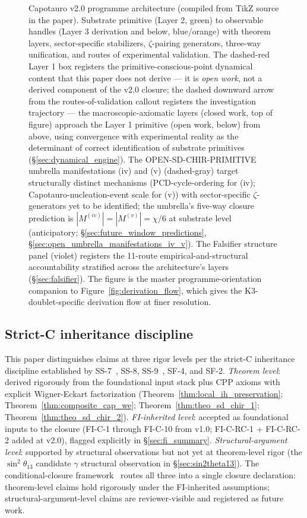 \documentclass[11pt,letterpaper]{article}
\begin{document}
\begin{figure}[H]
\begin{tikzpicture}
\end{tikzpicture}
\caption{Capotauro v2.0 programme architecture (compiled from TikZ source in the paper). Substrate primitive (Layer 2, green) to observable handles (Layer 3 derivation and below, blue/orange) with theorem layers, sector-specific stabilizers, $\zeta$-pairing generators, three-way unification, and routes of experimental validation. The dashed-red Layer 1 box registers the primitive-conscious-point dynamical content that this paper does not derive --- it is \emph{open work}, not a derived component of the v2.0 closure; the dashed downward arrow from the routes-of-validation callout registers the investigation trajectory --- the macroscopic-axiomatic layers (closed work, top of figure) approach the Layer 1 primitive (open work, below) from above, using convergence with experimental reality as the determinant of correct identification of substrate primitives (\S\ref{sec:dynamical_engine}). The OPEN-SD-CHIR-PRIMITIVE umbrella manifestations (iv) and (v) (dashed-gray) target structurally distinct mechanisms (PCD-cycle-ordering for (iv); Capotauro-nucleation-event scale for (v)) with sector-specific $\zeta$-generators yet to be identified; the umbrella's five-way closure prediction is $|M^{(iv)}| = |M^{(v)}| = \chi/6$ at substrate level (anticipatory; \S\ref{sec:future_window_predictions}, \S\ref{sec:open_umbrella_manifestations_iv_v}). The Falsifier structure panel (violet) registers the 11-route empirical-and-structural accountability stratified across the architecture's layers (\S\ref{sec:falsifier}). The figure is the master programme-orientation companion to Figure~\ref{fig:derivation_flow}, which gives the K3-doublet-specific derivation flow at finer resolution.}
\label{fig:programme_architecture}
\end{figure}

\subsection{Strict-C inheritance discipline}\label{sec:strict_c}

This paper distinguishes claims at three rigor levels per the strict-C inheritance discipline established by SS-7~\cite{abshier_ss7}, SS-8, SS-9~\cite{abshier_ss9}, SF-4, and SF-2. \emph{Theorem level}: derived rigorously from the foundational input stack plus CPP axioms with explicit Wigner-Eckart factorization (Theorem~\ref{thm:local_ih_preservation}; Theorem~\ref{thm:composite_cap_we}; Theorem~\ref{thm:theo_sd_chir_1}; Theorem~\ref{thm:theo_sd_chir_2}). \emph{FI-inherited level}: accepted as foundational inputs to the closure (FI-C-1 through FI-C-10 from v1.0; FI-C-RC-1 + FI-C-RC-2 added at v2.0), flagged explicitly in \S\ref{sec:fi_summary}. \emph{Structural-argument level}: supported by structural observations but not yet at theorem-level rigor (the $\sin^2\theta_{13}$ candidate $\gamma$ structural observation in \S\ref{sec:sin2theta13}). The conditional-closure framework~\cite{abshier_conditional_closure} routes all three into a single closure declaration: theorem-level claims hold rigorously under the FI-inherited assumptions; structural-argument-level claims are reviewer-visible and registered as future work.
\end{document}
